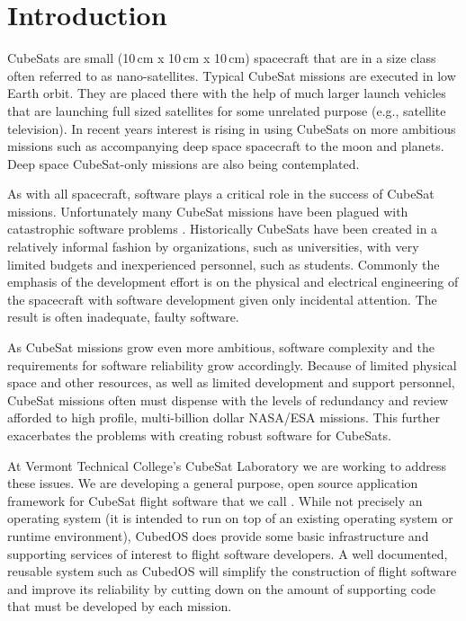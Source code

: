 
\section{Introduction}
\label{sec:introduction}

CubeSats are small (10\,cm x 10\,cm x 10\,cm) spacecraft that are in a size class often referred
to as nano-satellites. Typical CubeSat missions are executed in low Earth orbit. They are placed
there with the help of much larger launch vehicles that are launching full sized satellites for
some unrelated purpose (e.g., satellite television). In recent years interest is rising in using
CubeSats on more ambitious missions such as accompanying deep space spacecraft to the moon and
planets. Deep space CubeSat-only missions are also being contemplated. 

As with all spacecraft, software plays a critical role in the success of CubeSat missions.
Unfortunately many CubeSat missions have been plagued with catastrophic software problems
. Historically CubeSats have been created in a relatively informal
fashion by organizations, such as universities, with very limited budgets and inexperienced
personnel, such as students. Commonly the emphasis of the development effort is on the physical
and electrical engineering of the spacecraft with software development given only incidental
attention. The result is often inadequate, faulty software.

As CubeSat missions grow even more ambitious, software complexity and the requirements for
software reliability grow accordingly. Because of limited physical space and other resources, as
well as limited development and support personnel, CubeSat missions often must dispense with the
levels of redundancy and review afforded to high profile, multi-billion dollar NASA/ESA
missions. This further exacerbates the problems with creating robust software for CubeSats.

At Vermont Technical College's CubeSat Laboratory we are working to address these issues. We are
developing a general purpose, open source application framework for CubeSat flight software that
we call . While not precisely an operating system (it is intended to run on top
of an existing operating system or runtime environment), CubedOS does provide some basic
infrastructure and supporting services of interest to flight software developers. A well
documented, reusable system such as CubedOS will simplify the construction of flight software
and improve its reliability by cutting down on the amount of supporting code that must be
developed by each mission.

